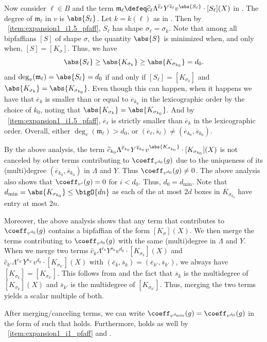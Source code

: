 \documentclass[letterpaper, 11pt]{amsart}
\begin{document}
\begin{pf}
Now consider $\ell\in B$ and the term $\mathfrak{m}_\ell \defeq \widehat{c}_{\ell} \Lambda^{\overline{e}_\ell} Y^{\overline{s}_\ell} v^{\abs{S_\ell}} \cdot [S_\ell](X)$ in .
The degree of $\mathfrak{m}_\ell$ in $v$ is $\abs{S_\ell}$.
Let $k = k(\ell)$ as in .
Then by ~\eqref{item:expansion1_i1.5_pfaff}, $S_\ell$ has shape $\sigma_\ell = \sigma_k$.
Note that among all bipfaffians $[S]$ of shape $\sigma$, the quantity $\abs{S}$ is minimized when, and only when, $[S] = [K_\sigma]$.
Thus, we have 
\[
    \abs{S_\ell} \geq \abs{K_{\sigma_k}} \geq \abs{K_{\sigma_{k_0}}} = d_0.
\]
and $\deg_v(\mathfrak{m}_\ell)= \abs{S_\ell} = d_0$ if and only if $[S_\ell] = [K_{\sigma_k}]$ and $\abs{K_{\sigma_{k}}} = \abs{K_{\sigma_{k_0}}}$.
Even though this can happen, when it happens we have that $\overline{e}_k$ is smaller than or equal to $\overline{e}_{k_0}$ in the lexicographic order by the choice of $k_0$, noting that $\abs{K_{\sigma_{k}}} = \abs{K_{\sigma_{k_0}}}$.
And by ~\eqref{item:expansion1_i1.5_pfaff}, $\overline{e}_\ell$ is strictly smaller than $\overline{e}_k$ in the lexicographic order.
Overall, either $\deg_v(\mathfrak{m}_\ell) > d_0$, or $(\overline{e}_\ell,\overline{s}_\ell) \neq (\overline{e}_{k_0}, \overline{s}_{k_0})$.

By the above analysis, the term $\widehat{c}_{k_0} \Lambda^{\overline{e}_{k_0}} Y^{\overline{s}_{k_0}} v^{\abs{K_{\sigma_{k_0}}}} \cdot [K_{\sigma_{k_0}}](X)$ is not canceled by other terms contributing to $\coeff_{v^{d_0}}(g)$ due to the uniqueness of its (multi)degree $(\overline{e}_{k_0}, \overline{s}_{k_0})$ in $\Lambda$ and $Y$.
Thus $\coeff_{v^{d_0}}(g)\neq 0$.
The above analysis also shows that $\coeff_{v^{i}}(g)=0$ for $i < d_0$.
Thus, $d_0 = d_{\min}$.
Note that $d_{\min} = \abs{K_{\sigma_{k_0}}} \leq \bigO{dn}$ as each of the at most $2d$ boxes in $K_{\sigma_{k_0}}$ have entry at most $2n$.

Moreover, the above analysis shows that any term that contributes to $\coeff_{v^{d_0}}(g)$ contains a bipfaffian of the form $[K_\sigma](X)$.
We then merge the terms contributing to $\coeff_{v^{d_0}}(g)$ with the same (multi)degree in $\Lambda$ and $Y$.
When we merge two terms $\widehat{c}_{k} \Lambda^{\overline{e}_k} Y^{\overline{s}_k} v^{d_0} \cdot [K_{\sigma_k}](X)$ and $\widehat{c}_{k'} \Lambda^{\overline{e}_{k'}} Y^{\overline{s}_{k'}} v^{d_0} \cdot [K_{\sigma_{k'}}](X)$ with $(\overline{e}_k,\overline{s}_k) = (\overline{e}_{k'}, \overline{s}_{k'})$, we always have $[K_{\sigma_{k}}] = [K_{\sigma_{k'}}]$.
This follows from  and the fact that $\overline{s}_{k}$ is the multidegree of $[K_{\sigma_{k}}](X)$ and $\overline{s}_{k'}$ is the multidegree of $[K_{\sigma_{k'}}]$.
Thus, merging the two terms yields a scalar multiple of both.

After merging/canceling terms, we can write $\coeff_{v^{d_{\min}}}(g) = \coeff_{v^{d_0}}(g)$ in the form of  such that  holds.
Furthermore,  holds as well by ~\eqref{item:expansion1_i1_pfaff} and .
\end{pf}
\end{document}
